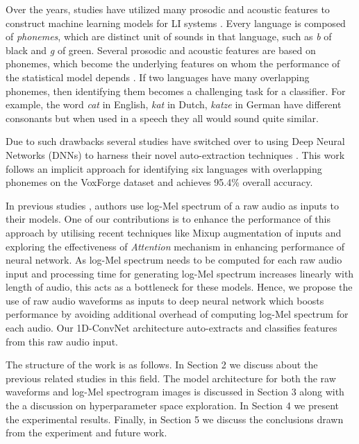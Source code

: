 \documentclass[runningheads]{llncs}
\begin{document}
Over the years, studies have utilized many prosodic and acoustic features to construct machine learning models for LI systems \cite{obuchi2005language}. Every language is composed of \emph{phonemes}, which are distinct unit of sounds in that language, such as \emph{b} of black and \emph{g} of green. Several prosodic and acoustic features are based on phonemes, which become the underlying features on whom the performance of the statistical model depends \cite{1659993,article}. If two languages have many overlapping phonemes, then identifying them  becomes a challenging task for a classifier. For example, the word \emph{cat} in English, \emph{kat} in Dutch, \emph{katze} in German have different consonants but when used in a speech they all would sound quite similar. 

Due to such drawbacks several studies have switched over to using Deep Neural Networks (DNNs) to harness their novel auto-extraction techniques \cite{bartz2017language,revay2019multiclass}. This work follows an implicit approach for identifying six languages with overlapping phonemes on the VoxForge \cite{VoxForge.org} dataset and achieves 95.4\% overall accuracy. 

In previous studies \cite{bartz2017language,montavon2009deep,revay2019multiclass}, authors use log-Mel spectrum of a raw audio as inputs to their models. One of our contributions is to enhance the performance of this approach by utilising recent techniques like Mixup augmentation of inputs and exploring the effectiveness of \emph{Attention} mechanism in enhancing performance of neural network. As log-Mel spectrum needs to be computed for each raw audio input and processing time for generating log-Mel spectrum increases linearly with length of audio, this acts as a bottleneck for these models. Hence, we propose the use of raw audio waveforms as inputs to deep neural network which boosts performance by avoiding additional overhead of computing log-Mel spectrum for each audio. Our 1D-ConvNet architecture auto-extracts and classifies features from this raw audio input.
 
The structure of the work is as follows. In Section 2 we discuss about the previous related studies in this field. The model architecture for both the raw waveforms and log-Mel spectrogram images is discussed in Section 3 along with the a discussion on hyperparameter space exploration. In Section 4 we present the experimental results. Finally, in Section 5 we discuss the conclusions drawn from the experiment and future work.
\end{document}
